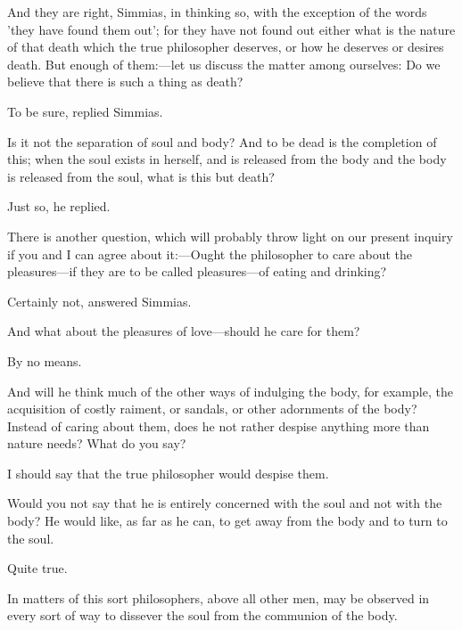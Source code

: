 \documentclass[11pt,letter]{article}
\begin{document}
\par  And they are right, Simmias, in thinking so, with the exception of the words 'they have found them out'; for they have not found out either what is the nature of that death which the true philosopher deserves, or how he deserves or desires death. But enough of them:—let us discuss the matter among ourselves: Do we believe that there is such a thing as death?

\par  To be sure, replied Simmias.

\par  Is it not the separation of soul and body? And to be dead is the completion of this; when the soul exists in herself, and is released from the body and the body is released from the soul, what is this but death?

\par  Just so, he replied.

\par  There is another question, which will probably throw light on our present inquiry if you and I can agree about it:—Ought the philosopher to care about the pleasures—if they are to be called pleasures—of eating and drinking?

\par  Certainly not, answered Simmias.

\par  And what about the pleasures of love—should he care for them?

\par  By no means.

\par  And will he think much of the other ways of indulging the body, for example, the acquisition of costly raiment, or sandals, or other adornments of the body? Instead of caring about them, does he not rather despise anything more than nature needs? What do you say?

\par  I should say that the true philosopher would despise them.

\par  Would you not say that he is entirely concerned with the soul and not with the body? He would like, as far as he can, to get away from the body and to turn to the soul.

\par  Quite true.

\par  In matters of this sort philosophers, above all other men, may be observed in every sort of way to dissever the soul from the communion of the body.
\end{document}
